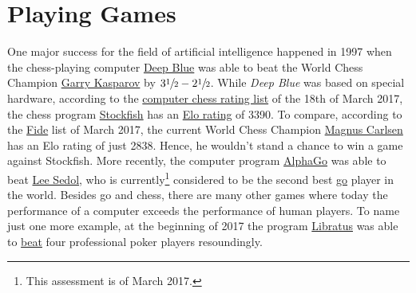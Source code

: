 \chapter{Playing Games}
One major success for the field of artificial intelligence happened in 1997 when the chess-playing computer
\href{https://en.wikipedia.org/wiki/Deep_Blue_(chess_computer)}{Deep Blue} was able to beat the World Chess
Champion \href{https://en.wikipedia.org/wiki/Garry_Kasparov}{Garry Kasparov} by $3\sfrac{1}{2}-2\sfrac{1}{2}$.
While \emph{\color{blue}Deep Blue} was based on special hardware, according to the
\href{http://www.computerchess.org.uk/ccrl/4040/rating_list_all.html}{computer chess rating list} of the 18th
of March 2017, the chess program \href{https://en.wikipedia.org/wiki/Stockfish_(chess)}{Stockfish} has an 
\href{https://en.wikipedia.org/wiki/Elo_rating_system}{Elo rating} of 3390.  To compare, according to the
\href{https://ratings.fide.com/top.phtml?list=men}{Fide} list of March 2017, the current 
World Chess Champion \href{https://en.wikipedia.org/wiki/Magnus_Carlsen}{Magnus Carlsen} has an Elo rating of
just 2838.  Hence, he wouldn't stand a chance to win a game against Stockfish.  More recently, the computer program
\href{https://en.wikipedia.org/wiki/AlphaGo}{AlphaGo} was able to beat
\href{https://en.wikipedia.org/wiki/Lee_Sedol}{Lee Sedol}, who is 
currently\footnote{This assessment is of March 2017.} 
considered to be the second best  
\href{https://en.wikipedia.org/wiki/Go_(game)}{go} player in the world.  Besides go and chess, there are many
other games where today the performance of a computer exceeds the performance of human players.  To name just
one more example, at the beginning of 2017 the program \href{https://en.wikipedia.org/wiki/Libratus}{Libratus} was able to 
\href{https://www.engadget.com/2017/01/31/libratus-the-poker-playing-ai-destroyed-its-four-human-rivals/}{beat}
four professional poker players resoundingly.

